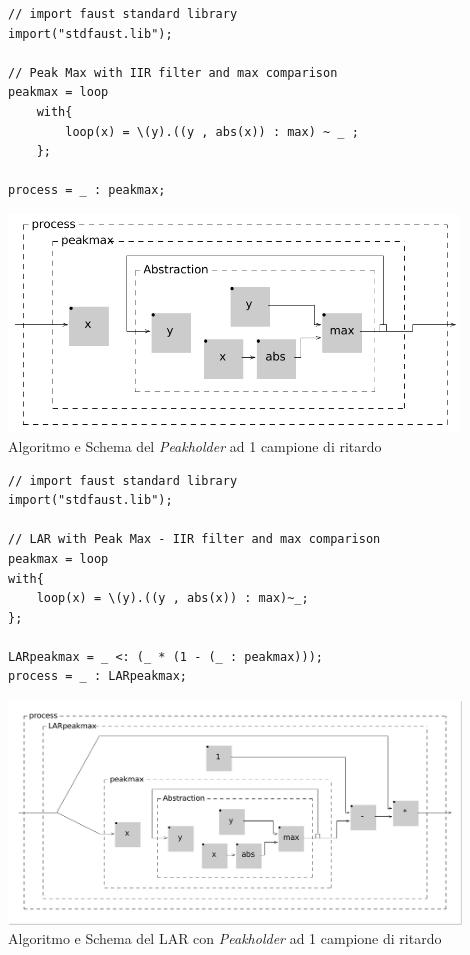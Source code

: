 \vspace{0.5cm}
\begin{lstlisting}
// import faust standard library
import("stdfaust.lib");

// Peak Max with IIR filter and max comparison
peakmax = loop
    with{
        loop(x) = \(y).((y , abs(x)) : max) ~ _ ;
    };
    
process = _ : peakmax;
\end{lstlisting}

\begin{center}
    \includegraphics[width=12cm]{figures/PeakholderIIR.pdf} \\
    {Algoritmo e Schema del \textit{Peakholder} ad 1 campione di ritardo} \\ 
    \end{center}
\clearpage 

\begin{lstlisting}
// import faust standard library
import("stdfaust.lib");
        
// LAR with Peak Max - IIR filter and max comparison
peakmax = loop
with{
    loop(x) = \(y).((y , abs(x)) : max)~_;
};
        
LARpeakmax = _ <: (_ * (1 - (_ : peakmax)));
process = _ : LARpeakmax;
\end{lstlisting}

\begin{center}
    \includegraphics[width=12cm]{figures/LARpeakmax.pdf} \\
    {Algoritmo e Schema del LAR con \textit{Peakholder} ad 1 campione di ritardo} \\ 
\end{center}
\vspace{0.5cm}

